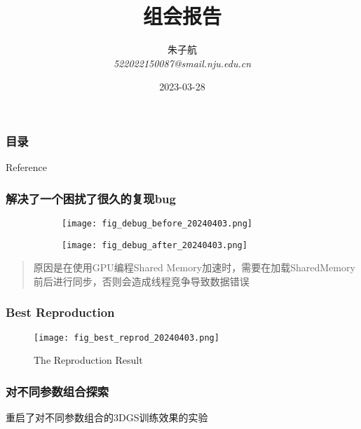 \documentclass{njupre/njupre}
\title[组会报告]{ 组会报告 }
\author[朱子航]{\texorpdfstring{朱子航 \\ \smallskip \textit{522022150087@smail.nju.edu.cn}}{}}
\date[\today]{\texorpdfstring{2023-03-28}{}}
\begin{document}
\begin{frame}
    \titlepage
\end{frame}

\begin{frame}
    \frametitle{目录}
    \tableofcontents
\end{frame}

\begin{frame}[allowframebreaks]{Reference}
    
    
\end{frame}

\begin{frame}
    \frametitle{解决了一个困扰了很久的复现bug}
    \begin{figure}
        \centering
            \begin{subfigure}{0.48\linewidth}
                \texttt{[image: fig\_debug\_before\_20240403.png]}
                \caption{}
            \end{subfigure}
            \begin{subfigure}{0.48\linewidth}
                \texttt{[image: fig\_debug\_after\_20240403.png]}
                \caption{}
            \end{subfigure}
    \end{figure}
\begin{quote}
    原因是在使用GPU编程Shared Memory加速时，需要在加载SharedMemory前后进行同步，否则会造成线程竞争导致数据错误
\end{quote}
\end{frame}

\begin{frame}
    \frametitle{Best Reproduction}
    \begin{figure}
        \texttt{[image: fig\_best\_reprod\_20240403.png]}
        \caption{The Reproduction Result}
    \end{figure}
\end{frame}

\begin{frame}
    \frametitle{对不同参数组合探索}
    重启了对不同参数组合的3DGS训练效果的实验
    
\end{frame}
\end{document}

